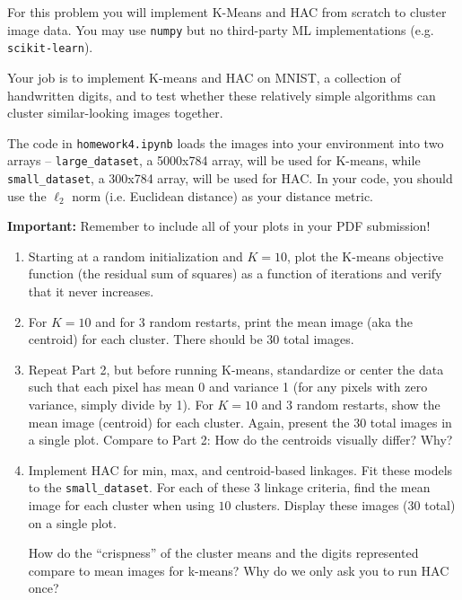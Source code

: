 \documentclass[submit]{../harvardml}
\begin{document}
\newpage

\begin{problem}

  For this problem you will implement K-Means and HAC from scratch to cluster image data. You may use \texttt{numpy} but no third-party ML implementations (e.g. \texttt{scikit-learn}).

  Your job is to implement K-means and HAC on MNIST, a collection of handwritten digits, and to test whether these relatively simple algorithms can cluster similar-looking images together.

  The code in \texttt{homework4.ipynb} loads the images into your environment into two arrays -- \texttt{large\_dataset}, a 5000x784 array, will be used for K-means, while \texttt{small\_dataset}, a 300x784 array, will be used for HAC. In your code, you should use the $\ell_2$ norm (i.e. Euclidean distance) as your distance metric.

  \textbf{Important:} Remember to include all of your plots in your PDF submission!

  \begin{enumerate}
    \item Starting at a random initialization and $K = 10$, plot the K-means objective function (the residual sum of squares) as a function of iterations and verify that it never increases.

    \item For $K=10$ and for 3 random restarts, print the mean image (aka the centroid) for each cluster. There should be 30 total images.

    \item Repeat Part 2, but before running K-means, standardize or center the data such that each pixel has mean 0 and variance 1 (for any pixels with zero variance, simply divide by 1). For $K=10$ and 3 random restarts, show the mean image (centroid) for each cluster. Again, present the 30 total images in a single plot. Compare to Part 2: How do the centroids visually differ? Why?

    \item Implement HAC for min, max, and centroid-based linkages. Fit these models to the \texttt{small\_dataset}.  For each of these 3 linkage criteria, find the mean image for each cluster when using $10$ clusters. Display these images (30 total) on a single plot.

      How do the ``crispness'' of the cluster means and the digits represented compare to mean images for k-means?  
      Why do we only ask you to run HAC once?  


\end{enumerate}
\end{problem}
\end{document}
